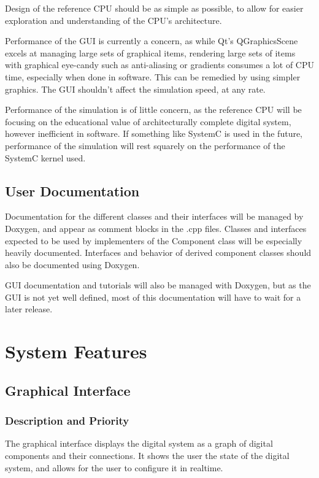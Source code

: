 \documentclass[12pt]{article}
\begin{document}
Design of the reference CPU should be as simple as possible, to allow for easier exploration and understanding of the CPU’s architecture.

Performance of the GUI is currently a concern, as while Qt's QGraphicsScene excels at managing large sets of graphical items, rendering large sets of items with graphical eye-candy such as anti-aliasing or gradients consumes a lot of CPU time, especially when done in software. This can be remedied by using simpler graphics. The GUI shouldn't affect the simulation speed, at any rate.

Performance of the simulation is of little concern, as the reference CPU will be focusing on the educational value of architecturally complete digital system, however inefficient in software. If something like SystemC is used in the future, performance of the simulation will rest squarely on the performance of the SystemC kernel used.

\subsection{User Documentation}
Documentation for the different classes and their interfaces will be managed by Doxygen, and appear as comment blocks in the .cpp files. Classes and interfaces expected to be used by implementers of the Component class will be especially heavily documented. Interfaces and behavior of derived component classes should also be documented using Doxygen.

GUI documentation and tutorials will also be managed with Doxygen, but as the GUI is not yet well defined, most of this documentation will have to wait for a later release.

\section{System Features}

\subsection{Graphical Interface}

\subsubsection{Description and Priority}
The graphical interface displays the digital system as a graph of digital components and their connections. It shows the user the state of the digital system, and allows for the user to configure it in realtime.
\end{document}
